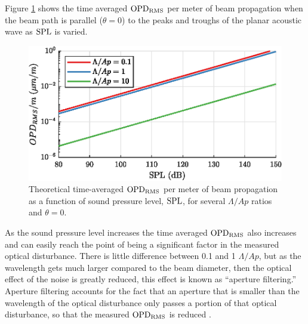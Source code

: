 Figure \ref{fig:03_planar_sample_calc_3} shows the time averaged $\operatorname{OPD_{RMS}}$ per meter of beam propagation when the beam path is parallel ($\theta=0$) to the peaks and troughs of the planar acoustic wave as $\operatorname{SPL}$ is varied.
\begin{figure}
  \centering
  \includegraphics{../matlab/03_aero_optics_acoustics/planar_sample_calc_3.eps}
  \caption{Theoretical time-averaged $\operatorname{OPD_{RMS}}$ per meter of beam propagation as a function of sound pressure level, $\operatorname{SPL}$, for several $\Lambda/Ap$ ratios and $\theta=0$.}
  \label{fig:03_planar_sample_calc_3}
\end{figure}
As the sound pressure level increases the time averaged $\operatorname{OPD_{RMS}}$ also increases and can easily reach the point of being a significant factor in the measured optical disturbance.
There is little difference between 0.1 and 1 $\Lambda/Ap$, but as the wavelength gets much larger compared to the beam diameter, then the optical effect of the noise is greatly reduced, this effect is known as ``aperture filtering.''
Aperture filtering accounts for the fact that an aperture that is smaller than the wavelength of the optical disturbance only passes a portion of that optical disturbance, so that the measured $\operatorname{OPD_{RMS}}$ is reduced \cite{Siegenthaler-2005-KQ2HGmfp}.

